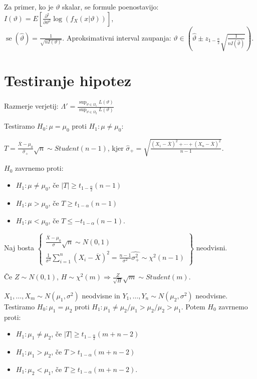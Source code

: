 \documentclass[11pt,a4paper]{amsart}
\theoremstyle{definition} %
\theoremstyle{plain} %
\DeclareMathOperator{\se}{se}
\begin{document}
Za primer, ko je $\vartheta$ skalar, se formule poenostavijo:
$I(\vartheta) = E[\frac{\partial^2}{\partial\vartheta^2}
\log(f_X(x|\vartheta))]$, \\
$\se(\hat{\vartheta}) = \frac{1}{\sqrt{n I(\vartheta)}}$.
Aproksimativni interval zaupanja: $\vartheta \in \left( \hat{\vartheta} \pm z_{1-\frac{\alpha}{2}}
\sqrt{\frac{1}{nI(\hat{\vartheta})}}\right)$.

\section*{Testiranje hipotez}

Razmerje verjetij: $\Lambda' = \frac{\sup _{\vartheta \in \Omega_1}L(\vartheta)}{\sup _{\vartheta \in \Omega_2}L(\vartheta)}$

Testiramo $H_0: \mu = \mu_0$ proti $H_1: \mu \neq \mu_0$:

$T = \frac{\overline{X} - \mu_0}{\widehat{\sigma}_+}\sqrt{n} \sim Student(n-1)$, kjer $\widehat{\sigma}_+ = \sqrt{\frac{(X_1 - \overline{X})^2 + \cdots + (X_n - \overline{X})^2}{n-1}}$.

$H_0$ zavrnemo proti:
\begin{itemize}
\item $H_1: \mu \neq \mu_0$, če $|T| \geq t_{1-\frac{\alpha}{2}}(n-1)$
\item $H_1: \mu > \mu_0$, če $T \geq t_{1-\alpha}(n-1)$
\item $H_1: \mu < \mu_0$, če $T \leq -t_{1-\alpha}(n-1)$.
\end{itemize}

Naj bosta
$\left\{ \begin{matrix} \frac{\overline{X}-\mu_0}{\sigma} \sqrt{n} \sim N(0,1) \\
\frac{1}{\sigma^2}\sum_{i=1}^n (X_i - \overline{X})^2 = \frac{n-1}{\sigma^2}\widehat{\sigma_+^2} \sim \chi^2 (n-1)  \end{matrix} \right\}$  neodvisni.

Če $Z \sim N(0,1)$, $H \sim \chi^2(m) \Longrightarrow \frac{Z}{\sqrt{H}}\sqrt{m} \sim Student(m)$.

$X_1, \ldots ,X_m \sim N(\mu_1, \sigma^2)$ neodvisne in $Y_1, \ldots ,Y_n \sim N(\mu_2 , \sigma^2)$ neodvisne. Testiramo $H_0: \mu_1 = \mu_2$ proti $H_1: \mu_1 \neq \mu_2 / \mu_1 > \mu_2 / \mu_2 > \mu_1$. Potem $H_0$ zavrnemo proti:
\begin{itemize}
\item $H_1: \mu_1 \neq \mu_2$, če $|T| \geq t_{1-\frac{\alpha}{2}}(m+n-2)$
\item $H_1: \mu_1 > \mu_2$, če $T > t_{1-\alpha}(m+n-2)$
\item $H_1: \mu_2 < \mu_1$, če $T \geq t_{1-\alpha}(m+n-2)$.
\end{itemize}
\end{document}
